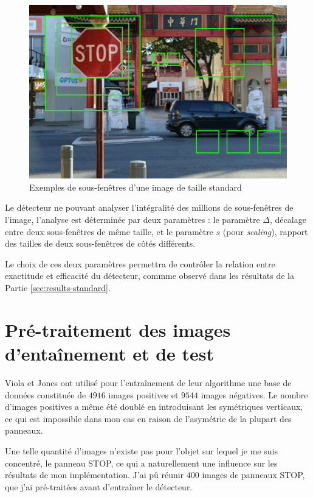 \documentclass[12pt,a4paper]{article}
\begin{document}
\begin{figure}[h]
    \includegraphics[scale = 0.5]{sous-fenetre}
    \centering
    \caption{Exemples de sous-fenêtres d'une image de taille standard}
\end{figure}

Le détecteur ne pouvant analyser l'intégralité des millions de sous-fenêtres de l'image, l'analyse est déterminée par deux paramètres : le paramètre $\Delta$, décalage entre deux sous-fenêtres de même taille, et le paramètre $s$ (pour \textit{scaling}), rapport des tailles de deux sous-fenêtres de côtés différents.

Le choix de ces deux paramètres permettra de contrôler la relation entre exactitude et efficacité du détecteur, commme observé dans les résultats de la Partie \ref{sec:results-standard}.

\section{Pré-traitement des images d'entaînement et de test}
\label{sec:pre-traitement}
Viola et Jones ont utilisé pour l'entraînement de leur algorithme une base de données constituée de $4916$ images positives et $9544$ images négatives. Le nombre d'images positives a même été doublé en introduisant les symétriques verticaux, ce qui est impossible dans mon cas en raison de l'asymétrie de la plupart des panneaux. 

Une telle quantité d'images n'existe pas pour l'objet sur lequel je me suis concentré, le panneau STOP, ce qui a naturellement une influence sur les résultats de mon implémentation. J'ai pû réunir $400$ images de panneaux STOP, que j'ai pré-traitées avant d'entraîner le détecteur.
\end{document}
